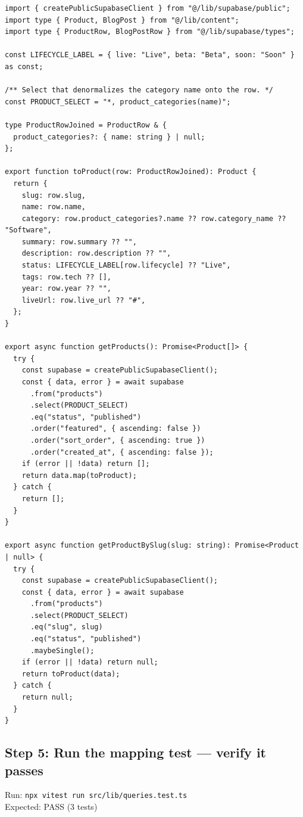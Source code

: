 \documentclass[11pt,a4paper]{article}
\begin{document}
\begin{lstlisting}
import { createPublicSupabaseClient } from "@/lib/supabase/public";
import type { Product, BlogPost } from "@/lib/content";
import type { ProductRow, BlogPostRow } from "@/lib/supabase/types";

const LIFECYCLE_LABEL = { live: "Live", beta: "Beta", soon: "Soon" } as const;

/** Select that denormalizes the category name onto the row. */
const PRODUCT_SELECT = "*, product_categories(name)";

type ProductRowJoined = ProductRow & {
  product_categories?: { name: string } | null;
};

export function toProduct(row: ProductRowJoined): Product {
  return {
    slug: row.slug,
    name: row.name,
    category: row.product_categories?.name ?? row.category_name ?? "Software",
    summary: row.summary ?? "",
    description: row.description ?? "",
    status: LIFECYCLE_LABEL[row.lifecycle] ?? "Live",
    tags: row.tech ?? [],
    year: row.year ?? "",
    liveUrl: row.live_url ?? "#",
  };
}

export async function getProducts(): Promise<Product[]> {
  try {
    const supabase = createPublicSupabaseClient();
    const { data, error } = await supabase
      .from("products")
      .select(PRODUCT_SELECT)
      .eq("status", "published")
      .order("featured", { ascending: false })
      .order("sort_order", { ascending: true })
      .order("created_at", { ascending: false });
    if (error || !data) return [];
    return data.map(toProduct);
  } catch {
    return [];
  }
}

export async function getProductBySlug(slug: string): Promise<Product | null> {
  try {
    const supabase = createPublicSupabaseClient();
    const { data, error } = await supabase
      .from("products")
      .select(PRODUCT_SELECT)
      .eq("slug", slug)
      .eq("status", "published")
      .maybeSingle();
    if (error || !data) return null;
    return toProduct(data);
  } catch {
    return null;
  }
}
\end{lstlisting}

\subsection*{Step 5: Run the mapping test --- verify it passes}

Run: \texttt{npx vitest run src/lib/queries.test.ts}\\
Expected: PASS (3 tests)
\end{document}
